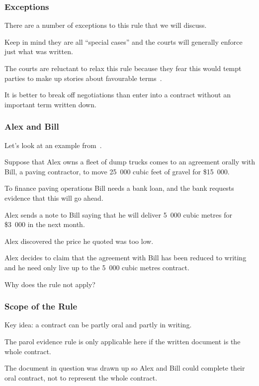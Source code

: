 \begin{frame}
\frametitle{Exceptions}

There are a number of exceptions to this rule that we will discuss.

Keep in mind they are all ``special cases'' and the courts will generally enforce just what was written.

The courts are reluctant to relax this rule because they fear this would tempt parties to make up stories about favourable terms~\cite{lba}.

It is better to break off negotiations than enter into a contract without an important term written down.

\end{frame}



\begin{frame}
\frametitle{Alex and Bill}

Let's look at an example from~\cite{lba}.

Suppose that Alex owns a fleet of dump trucks comes to an agreement orally with Bill, a paving contractor, to move 25~000 cubic feet of gravel for \$15~000.

To finance paving operations Bill needs a bank loan, and the bank requests evidence that this will go ahead.

Alex sends a note to Bill saying that he will deliver 5~000 cubic metres for \$3~000 in the next month.

Alex discovered the price he quoted was too low. 

Alex decides to claim that the agreement with Bill has been reduced to writing and he need only live up to the 5~000 cubic metres contract.

Why does the rule not apply?

\end{frame}



\begin{frame}
\frametitle{Scope of the Rule}

Key idea: a contract can be partly oral and partly in writing.

The parol evidence rule is only applicable here if the written document is the whole contract.

The document in question was drawn up so Alex and Bill could complete their oral contract, not to represent the whole contract.

\end{frame}



